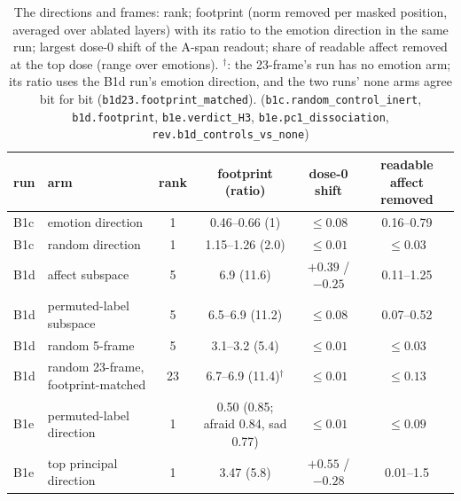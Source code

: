 \documentclass[11pt]{article}
\newcommand{\rid}[1]{{\footnotesize\texttt{#1}}}
\begin{document}
\begin{table}[t]\centering\footnotesize
\caption{The directions and frames: rank; footprint (norm removed per masked position, averaged over ablated layers) with its ratio to the emotion direction in the same run; largest dose-0 shift of the A-span readout; share of readable affect removed at the top dose (range over emotions). $^{\dagger}$: the 23-frame's run has no emotion arm; its ratio uses the B1d run's emotion direction, and the two runs' none arms agree bit for bit (\rid{b1d23.footprint\_matched}). (\rid{b1c.random\_control\_inert}, \rid{b1d.footprint}, \rid{b1e.verdict\_H3}, \rid{b1e.pc1\_dissociation}, \rid{rev.b1d\_controls\_vs\_none})}
\label{tab:dirs}
\begin{tabular}{llcccc}\toprule
run & arm & rank & footprint (ratio) & dose-0 shift & readable affect removed \\ \midrule
B1c & emotion direction & 1 & 0.46--0.66 (1) & $\le 0.08$ & 0.16--0.79 \\
B1c & random direction & 1 & 1.15--1.26 (2.0) & $\le 0.01$ & $\le 0.03$ \\
B1d & affect subspace & 5 & 6.9 (11.6) & $+0.39$ / $-0.25$ & 0.11--1.25 \\
B1d & permuted-label subspace & 5 & 6.5--6.9 (11.2) & $\le 0.08$ & 0.07--0.52 \\
B1d & random 5-frame & 5 & 3.1--3.2 (5.4) & $\le 0.01$ & $\le 0.03$ \\
B1d & random 23-frame, footprint-matched & 23 & 6.7--6.9 (11.4)$^{\dagger}$ & $\le 0.01$ & $\le 0.13$ \\
B1e & permuted-label direction & 1 & 0.50 (0.85; afraid 0.84, sad 0.77) & $\le 0.01$ & $\le 0.09$ \\
B1e & top principal direction & 1 & 3.47 (5.8) & $+0.55$ / $-0.28$ & 0.01--1.5 \\ \bottomrule
\end{tabular}
\end{table}
\end{document}
